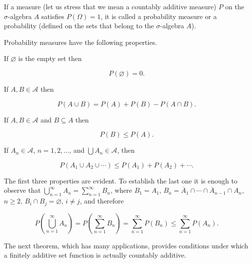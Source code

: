 If a measure (let us stress that we mean a countably additive measure) $P$ on the $\sigma$-algebra $A$ satisfies $P(\Omega) = 1$, it is called a probability measure or a probability (defined on the sets that belong to the $\sigma$-algebra $A$).

Probability measures have the following properties.

If $\varnothing$ is the empty set then

$$P(\varnothing) = 0.$$

If $A, B \in \mathcal{A}$ then

$$P(A \cup B) = P(A) + P(B) - P(A \cap B).$$

If $A, B \in \mathcal{A}$ and $B \subseteq A$ then

$$P(B) \leq P(A).$$

If $A_n \in \mathcal{A}$, $n = 1, 2, \ldots$, and $\bigcup A_n \in \mathcal{A}$, then

$$P(A_1 \cup A_2 \cup \cdots) \leq P(A_1) + P(A_2) + \cdots.$$

The first three properties are evident. To establish the last one it is enough to observe that $\bigcup_{n=1}^{\infty} A_n = \sum_{n=1}^{\infty} B_n$, where $B_1 = A_1$, $B_n = \overline{A}_1 \cap \cdots \cap \overline{A}_{n-1} \cap A_n$, $n \geq 2$, $B_i \cap B_j = \varnothing$, $i \neq j$, and therefore

$$P\left(\bigcup_{n=1}^{\infty} A_n\right) = P\left(\sum_{n=1}^{\infty} B_n\right) = \sum_{n=1}^{\infty} P(B_n) \leq \sum_{n=1}^{\infty} P(A_n).$$

The next theorem, which has many applications, provides conditions under which a finitely additive set function is actually countably additive.
